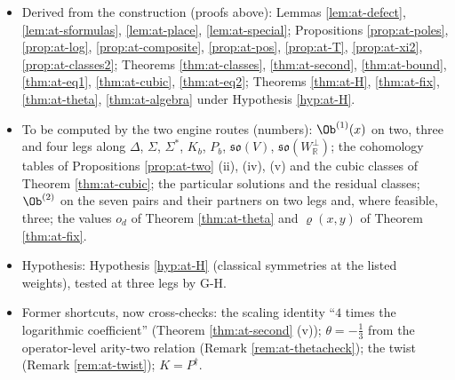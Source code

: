 \begin{itemize}
\item Derived from the construction (proofs above): Lemmas \ref{lem:at-defect}, \ref{lem:at-sformulas}, \ref{lem:at-place}, \ref{lem:at-special}; Propositions \ref{prop:at-poles}, \ref{prop:at-log}, \ref{prop:at-composite}, \ref{prop:at-pos}, \ref{prop:at-T}, \ref{prop:at-xi2}, \ref{prop:at-classes2}; Theorems \ref{thm:at-classes}, \ref{thm:at-second}, \ref{thm:at-bound}, \ref{thm:at-eq1}, \ref{thm:at-cubic}, \ref{thm:at-eq2}; Theorems \ref{thm:at-H}, \ref{thm:at-fix}, \ref{thm:at-theta}, \ref{thm:at-algebra} under Hypothesis \ref{hyp:at-H}.
\item To be computed by the two engine routes (numbers): $\Ob^{(1)}(x)$ on two, three and four legs along $\Delta$, $\Sigma$, $\Sigma^*$, $K_b$, $P_b$, $\mathfrak{so}(V)$, $\mathfrak{so}(W^\perp_{\mathbb R})$; the cohomology tables of Propositions \ref{prop:at-two} (ii), (iv), (v) and the cubic classes of Theorem \ref{thm:at-cubic}; the particular solutions and the residual classes; $\Ob^{(2)}$ on the seven pairs and their partners on two legs and, where feasible, three; the values $o_d$ of Theorem \ref{thm:at-theta} and $\varrho(x,y)$ of Theorem \ref{thm:at-fix}.
\item Hypothesis: Hypothesis \ref{hyp:at-H} (classical symmetries at the listed weights), tested at three legs by G-H.
\item Former shortcuts, now cross-checks: the scaling identity ``$4$ times the logarithmic coefficient'' (Theorem \ref{thm:at-second} (v)); $\theta=-\tfrac13$ from the operator-level arity-two relation (Remark \ref{rem:at-thetacheck}); the twist (Remark \ref{rem:at-twist}); $K=P^\dagger$.
\end{itemize}


